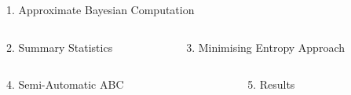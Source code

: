 \documentclass[ %
                  author={Dominic Hutchinson},
                supervisor={Dr. Daniel Lawson \& Dr. Sam Tickle},
                    degree={MEng Maths  and Computer Science},
                     title={Bayesian Modelling of Epidemic Events},
                  subtitle={Summary Statistic Selection for Approximate Bayesian Computation Methods},
                      type={},
                      year={2021}
               ]{poster}
\begin{document}

\begin{frame}{}

  \vfill

  \begin{columns}[t]

    \begin{column}{0.900\linewidth}
      \begin{block}{\Large 1. Approximate Bayesian Computation}
        \cite[]{ABC_for_infectious_disease_modelling}
      \end{block}
    \end{column}

  \end{columns}

  \vfill

  \begin{columns}[t]

    \begin{column}{0.422\linewidth}
      \begin{block}{\Large 2. Summary Statistics}
      \end{block}
    \end{column}

    \begin{column}{0.422\linewidth}
      \begin{block}{\Large 3. Minimising Entropy Approach}
      \end{block}
    \end{column}

  \end{columns}

  \vfill

  \begin{columns}[t]

    \begin{column}{0.422\linewidth}
      \begin{block}{\Large 4. Semi-Automatic ABC}
      \end{block}
    \end{column}

    \begin{column}{0.422\linewidth}
      \begin{block}{\Large 5. Results}
      \end{block}
    \end{column}

  \end{columns}

  \vfill

\end{frame}

\end{document}
